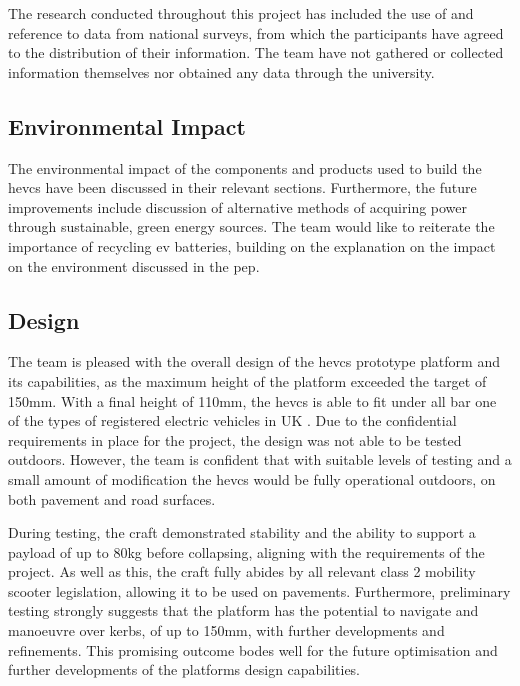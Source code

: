 \documentclass [12pt]{article}
\begin{document}
The research conducted throughout this project has included the use of and reference to data from national surveys, from which the participants have agreed to the distribution of their information. The team have not gathered or collected information themselves nor obtained any data through the university.   

\subsection{Environmental Impact}

The environmental impact of the components and products used to build the \gls{hevcs} have been discussed in their relevant sections. Furthermore, the future improvements include discussion of alternative methods of acquiring power through sustainable, green energy sources. The team would like to reiterate the importance of recycling \gls{ev} batteries, building on the explanation on the impact on the environment discussed in the \gls{pep}. 

\subsection{Design}

The team is pleased with the overall design of the \gls{hevcs} prototype platform and its capabilities, as the maximum height of the platform exceeded the target of 150mm. With a final height of 110mm, the \gls{hevcs} is able to fit under all bar one of the types of registered electric vehicles in UK \cite{carsinit}. Due to the confidential requirements in place for the project, the design was not able to be tested outdoors. However, the team is confident that with suitable levels of testing and a small amount of modification the \gls{hevcs} would be fully operational outdoors, on both pavement and road surfaces.  

During testing, the craft demonstrated stability and the ability to support a payload of up to 80kg before collapsing, aligning with the requirements of the project. As well as this, the craft fully abides by all relevant class 2 mobility scooter legislation, allowing it to be used on pavements.  Furthermore, preliminary testing strongly suggests that the platform has the potential to navigate and manoeuvre over kerbs, of up to 150mm, with further developments and refinements. This promising outcome bodes well for the future optimisation and further developments of the platforms design capabilities.  
\end{document}
